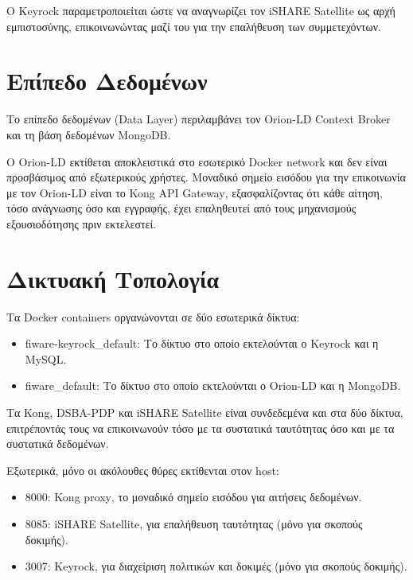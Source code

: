 Ο \textlatin{Keyrock} παραμετροποιείται ώστε να αναγνωρίζει τον
\textlatin{iSHARE Satellite} ως αρχή εμπιστοσύνης, επικοινωνώντας μαζί του
για την επαλήθευση των συμμετεχόντων.

\section{Επίπεδο Δεδομένων}
\label{sec:data-layer}

Το επίπεδο δεδομένων (\textlatin{Data Layer}) περιλαμβάνει τον
\textlatin{Orion-LD Context Broker} και τη βάση δεδομένων \textlatin{MongoDB}.

Ο \textlatin{Orion-LD} εκτίθεται αποκλειστικά στο εσωτερικό
\textlatin{Docker network} και δεν είναι προσβάσιμος από εξωτερικούς
χρήστες. Μοναδικό σημείο εισόδου για την επικοινωνία με τον \textlatin{Orion-LD}
είναι το \textlatin{Kong API Gateway}, εξασφαλίζοντας ότι κάθε αίτηση, τόσο
ανάγνωσης όσο και εγγραφής, έχει επαληθευτεί από τους μηχανισμούς
εξουσιοδότησης πριν εκτελεστεί.

\section{Δικτυακή Τοπολογία}
\label{sec:network-topology}

Τα \textlatin{Docker containers} οργανώνονται σε δύο εσωτερικά δίκτυα:

\begin{itemize}
    \item \textlatin{fiware-keyrock\_default}: Το δίκτυο στο οποίο
    εκτελούνται ο \textlatin{Keyrock} και η \textlatin{MySQL}.
    \item \textlatin{fiware\_default}: Το δίκτυο στο οποίο εκτελούνται
    ο \textlatin{Orion-LD} και η \textlatin{MongoDB}.
\end{itemize}

Τα \textlatin{Kong}, \textlatin{DSBA-PDP} και \textlatin{iSHARE Satellite}
είναι συνδεδεμένα και στα δύο δίκτυα, επιτρέποντάς τους να επικοινωνούν
τόσο με τα συστατικά ταυτότητας όσο και με τα συστατικά δεδομένων.

Εξωτερικά, μόνο οι ακόλουθες θύρες εκτίθενται στον \textlatin{host}:
\begin{itemize}
    \item \textlatin{8000}: \textlatin{Kong proxy}, το μοναδικό σημείο
    εισόδου για αιτήσεις δεδομένων.
    \item \textlatin{8085}: \textlatin{iSHARE Satellite}, για
    επαλήθευση ταυτότητας (μόνο για σκοπούς δοκιμής).
    \item \textlatin{3007}: \textlatin{Keyrock}, για διαχείριση
    πολιτικών και δοκιμές (μόνο για σκοπούς δοκιμής).
\end{itemize}